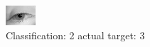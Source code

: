 \begin{figure}[h!]
\begin{center}
\includegraphics[width=0.60\columnwidth]{figures/ID2876_class_2_target_3.png}
\end{center}
\caption{ Classification: 2 actual target: 3}
\label{fig:ID2876_class_2_target_3}
\end{figure}
